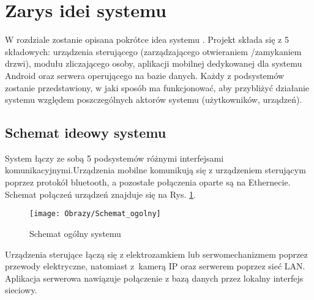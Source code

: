 % 
\newpage\section{Zarys idei systemu \textsl{\NazwaSys}}\label{sec:ideasystemu}
W rozdziale zostanie opisana pokrótce idea systemu \NazwaSys. Projekt składa się z 5 składowych: urządzenia sterującego (zarządzającego otwieraniem /zamykaniem drzwi), modułu zliczającego osoby, aplikacji mobilnej dedykowanej dla systemu Android oraz serwera operującego na bazie danych. Każdy z podsystemów zostanie przedstawiony, w jaki sposób ma funkcjonować, aby przybliżyć działanie systemu względem poszczególnych aktorów systemu (użytkowników, urządzeń).

\subsection{Schemat ideowy systemu \textsl{\NazwaSys}}
System łączy ze sobą 5 podsystemów różnymi interfejsami komunikacyjnymi.Urządzenia mobilne komunikują się z urządzeniem sterującym poprzez protokół bluetooth, a pozostałe połączenia oparte są na Ethernecie. Schemat połączeń urządzeń znajduje się na Rys. \ref{Schemat ogólny systemu}.

\begin{figure}[!h]
	\centering
	\texttt{[image: Obrazy/Schemat\_ogolny]}
	\caption{Schemat ogólny systemu}
	\label{Schemat ogólny systemu}
\end{figure}

Urządzenia sterujące łączą się z elektrozamkiem lub serwomechanizmem poprzez przewody elektryczne, natomiast z~kamerą IP oraz serwerem poprzez sieć LAN. Aplikacja serwerowa nawiązuje połączenie z bazą danych przez lokalny interfejs sieciowy.

